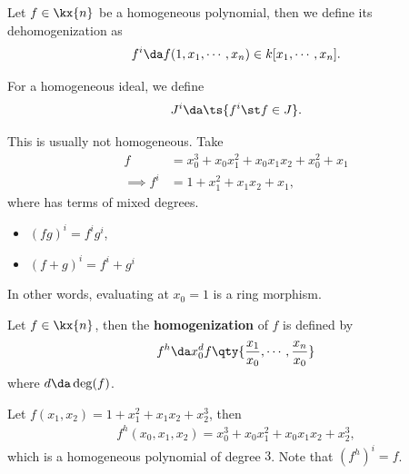 \begin{definition}

Let \(f\in \kx{n}\) be a homogeneous polynomial, then we define its
dehomogenization as
\begin{align*}  
f^i \da f(1, x_1, \cdots, x_n) \in k[x_1,\cdots, x_n]
.\end{align*}

For a homogeneous ideal, we define
\begin{align*}  
J^i \da \ts{f^i \st f\in J}
.\end{align*}

\end{definition}

\begin{example}

This is usually not homogeneous. Take
\begin{align*}  
f &= x_0^3 + x_0 x_1^2 + x_0 x_1 x_2 + x_0^2 + x_1 \\
\implies f^i &= 1  +x_1^2 + x_1 x_2 + x_1
,\end{align*} where has terms of mixed degrees.

\end{example}

\begin{remark}

\envlist

\begin{itemize}
\tightlist
\item
  \((fg)^i = f^i g^i\),
\item
  \((f+g)^i = f^i + g^i\)
\end{itemize}

In other words, evaluating at \(x_0 = 1\) is a ring morphism.

\end{remark}

\begin{definition}

Let \(f\in \kx{n}\), then the \textbf{homogenization} of \(f\) is
defined by
\begin{align*}  
f^h \da x_0^d f\qty{ {x_1 \over x_0}, \cdots, {x_n \over x_0} }
\end{align*} where \(d\da \deg(f)\).

\end{definition}

\begin{example}[?]

Let \(f(x_1, x_2) = 1 + x_1^2 + x_1 x_2 + x_2^3\), then
\begin{align*}  
f^h(x_0, x_1, x_2) = x_0^3 + x_0 x_1^2 + x_0 x_1 x_2 + x_2^3
,\end{align*} which is a homogeneous polynomial of degree \(3\). Note
that \((f^h)^i = f\).

\end{example}

